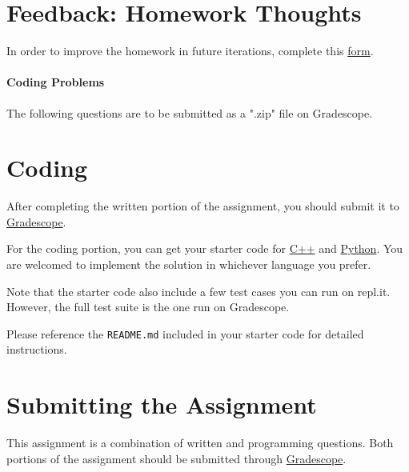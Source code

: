 \documentclass [12pt]{article}
\begin{document}



\section{Feedback: Homework Thoughts }

In order to improve the homework in future iterations, complete this \href{https://forms.gle/h3mZjdF4e1y4tXiZ8}{form}.




\pagebreak
\begin{Instruction}

\paragraph{Coding Problems} The following questions are to be submitted as a ".zip" file on Gradescope. 

\end{Instruction}

\section{Coding }
After completing the written portion of the assignment, you should submit it to \href{https://www.gradescope.com/courses/350304}{Gradescope}.

For the coding portion, you can get your starter code for \href{https://replit.com/team/COMP285/HW5-Code}{C++} and \href{https://replit.com/team/COMP285/HW5-Code-Python}{Python}. You are welcomed to implement the solution in whichever language you prefer.

Note that the starter code also include a few test cases you can run on repl.it. However, the full test suite is the one run on Gradescope.

Please reference the \texttt{README.md} included in your starter code for detailed instructions.

\section*{Submitting the Assignment}

This assignment is a combination of written and programming questions. Both portions of the assignment should be submitted through \href{https://www.gradescope.com/courses/350304}{Gradescope}.
\end{document}
